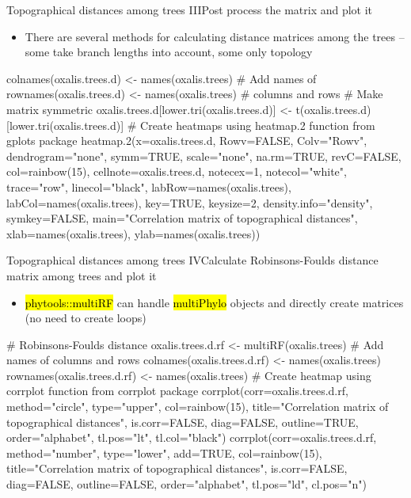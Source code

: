 \documentclass[compress, ucs, xelatex, 11pt, xcolor=svgnames,
  hyperref={
    bookmarks=true,
    unicode=true,
    colorlinks=true,
    pdftitle={Molecular data in R},
    plainpages=false,
    pdfauthor={Vojtech Zeisek},
    pdfsubject={Course about phylogeny and evolution in R},
    pdfcreator={XeLaTeX},
    pdfkeywords={R, evolution, phylogeny, molecular data},
    linkcolor=Tomato,
    anchorcolor=SaddleBrown,
    citecolor=Goldenrod,
    filecolor=DarkMagenta,
    menucolor=Sienna,
    urlcolor=DarkTurquoise,
    pdftex},
  url={hyphens, lowtilde} %
  ]{beamer}
\renewcommand{\texttt}[1]{\hl{\ttfamily #1}}
\begin{document}
\begin{frame}[fragile]{Topographical distances among trees III}{Post process the matrix and plot it}
  \begin{itemize}
    \item There are several methods for calculating distance matrices among the trees -- some take branch lengths into account, some only topology
  \end{itemize}
  \begin{spluscode}
    colnames(oxalis.trees.d) <- names(oxalis.trees) # Add names of
    rownames(oxalis.trees.d) <- names(oxalis.trees) # columns and rows
    # Make matrix symmetric
    oxalis.trees.d[lower.tri(oxalis.trees.d)] <-
      t(oxalis.trees.d)[lower.tri(oxalis.trees.d)]
    # Create heatmaps using heatmap.2 function from gplots package
    heatmap.2(x=oxalis.trees.d, Rowv=FALSE, Colv="Rowv", dendrogram="none",
      symm=TRUE, scale="none", na.rm=TRUE, revC=FALSE, col=rainbow(15),
      cellnote=oxalis.trees.d, notecex=1, notecol="white", trace="row",
      linecol="black", labRow=names(oxalis.trees),
      labCol=names(oxalis.trees), key=TRUE, keysize=2,
      density.info="density", symkey=FALSE, main="Correlation matrix of
      topographical distances", xlab=names(oxalis.trees),
      ylab=names(oxalis.trees))
  \end{spluscode}
\end{frame}

\begin{frame}[fragile]{Topographical distances among trees IV}{Calculate Robinsons-Foulds distance matrix among trees and plot it}
  \begin{itemize}
    \item \texttt{phytools::multiRF} can handle \texttt{multiPhylo} objects and directly create matrices (no need to create loops)
  \end{itemize}
  \begin{spluscode}
    # Robinsons-Foulds distance
    oxalis.trees.d.rf <- multiRF(oxalis.trees)
    # Add names of columns and rows
    colnames(oxalis.trees.d.rf) <- names(oxalis.trees)
    rownames(oxalis.trees.d.rf) <- names(oxalis.trees)
    # Create heatmap using corrplot function from corrplot package
    corrplot(corr=oxalis.trees.d.rf, method="circle", type="upper",
      col=rainbow(15), title="Correlation matrix of topographical
      distances", is.corr=FALSE, diag=FALSE, outline=TRUE,
      order="alphabet", tl.pos="lt", tl.col="black")
    corrplot(corr=oxalis.trees.d.rf, method="number", type="lower",
      add=TRUE, col=rainbow(15), title="Correlation matrix of
      topographical distances", is.corr=FALSE, diag=FALSE,
      outline=FALSE, order="alphabet", tl.pos="ld", cl.pos="n")
  \end{spluscode}
\end{frame}
\end{document}
